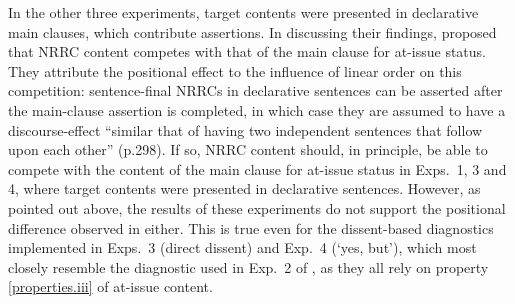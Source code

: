 \documentclass[times,linguex]{glossa}
\begin{document}
In the other three experiments, target contents were presented in declarative main clauses, which contribute assertions. In discussing their findings, \citet{syrett_experimental_2015} proposed that NRRC content competes with that of the main clause for at-issue status. %
%
They attribute the positional effect to the influence of linear order on this competition: sentence-final NRRCs in declarative sentences can be asserted after the main-clause assertion is completed, in which case they are assumed to have a discourse-effect \enquote{similar that of having two independent sentences that follow upon each other} (p.298).
%
If so, NRRC content should, in principle, be able to compete with the content of the main clause for at-issue status in Exps.~1, 3 and 4, where target contents were presented in declarative sentences. However, as pointed out above, the results of these experiments do not support the positional difference observed in \citealt{syrett_experimental_2015} either. This is true even for the dissent-based diagnostics implemented in Exps.~3 (direct dissent) and Exp.~4 (`yes, but'), which most closely resemble the diagnostic used in Exp.~2 of \citet{syrett_experimental_2015}, as they all rely on property \ref{properties.iii} of at-issue content.
\end{document}
